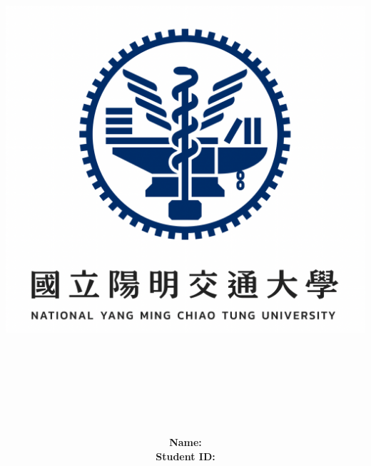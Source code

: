 \documentclass[12pt,a4paper]{report}
\title{
	\includegraphics[scale=0.5]{img/nycu_logo.png}\\
	~\\
	\LARGE\textbf{\reportSubtitle}\\
	\LARGE\textbf{\reportTitle}\\
}
\author{
	\begin{tabular}{rl}
		\textbf{Name: } & \authorName \\
		\textbf{Student ID: } & \authorStudentID  \\
	\end{tabular} \\~\\
	\authorDepartment
}
\begin{document}
	\maketitle
	\tableofcontents
	
	
	
	
	\begin{appendices}
		
	\end{appendices}
\end{document}

